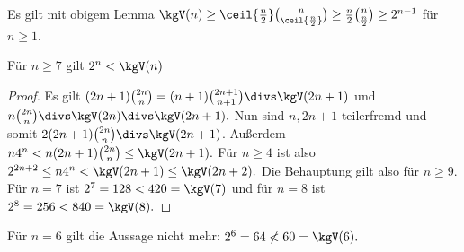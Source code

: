 Es gilt mit obigem Lemma
\begin{math}
    \kgV(n) \ge \ceil{\frac{n}{2}} \binom{n}{\ceil{\frac{n}{2}}}
    \ge \frac{n}{2} \binom{n}{\frac{n}{2}}
    \ge 2^{n-1}
\end{math}
für $n \ge 1$.

\begin{st}
    Für $n \ge 7$ gilt
    \begin{math}
        2^n < \kgV(n)
    \end{math}
    \begin{proof}
        Es gilt
        \begin{math}
            (2n+1) \binom{2n}{n} = (n+1) \binom{2n+1}{n+1} \divs \kgV(2n+1)
        \end{math}
        und
        \begin{math}
            n\binom{2n}{n} \divs \kgV(2n) \divs \kgV(2n+1).
        \end{math}
        Nun sind $n, 2n + 1$ teilerfremd und somit $2 (2n+1) \binom{2n}{n} \divs \kgV(2n+1)$.
        Außerdem
        \begin{math}
            n 4^n
            < n (2n+1) \binom{2n}{n}
            \le \kgV(2n+1).
        \end{math}
        Für $n \ge 4$ ist also
        \begin{math}
            2^{2n+2} \le n 4^n < \kgV(2n+1) \le \kgV(2n+2).
        \end{math}
        Die Behauptung gilt also für $n \ge 9$.
        Für $n = 7$ ist
        \begin{math}
            2^7 = 128 < 420 = \kgV(7)
        \end{math}
        und für $n = 8$ ist
        \begin{math}
            2^8 = 256 < 840 = \kgV(8).
        \end{math}
    \end{proof}
    \begin{note}
        Für $n = 6$ gilt die Aussage nicht mehr:
        \begin{math}
            2^6 = 64 \not< 60 = \kgV(6).
        \end{math}
    \end{note}
\end{st}

